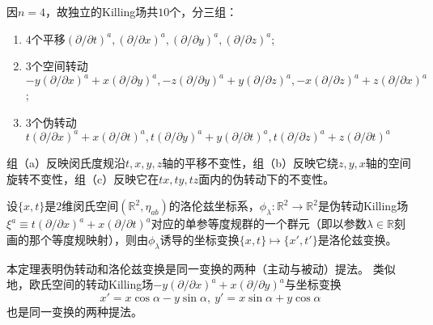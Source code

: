 \begin{example}
\begin{enumerate}[（1）]
因$n = 4$，故独立的Killing场共$10$个，分三组：
\begin{enumerate}[（a）]
\item $4$个平移$(\partial / \partial t)^a, (\partial / \partial x)^a, (\partial / \partial y)^a, (\partial / \partial z)^a$;
\item $3$个空间转动$-y(\partial / \partial x)^a + x(\partial / \partial y)^a, -z(\partial / \partial y)^a + y(\partial / \partial z)^a, -x(\partial / \partial z)^a + z(\partial / \partial x)^a$;
\item $3$个伪转动$t(\partial / \partial x)^a + x(\partial / \partial t)^a, t(\partial / \partial y)^a + y(\partial / \partial t)^a, t(\partial / \partial z)^a + z(\partial / \partial t)^a$
\end{enumerate}
组（a）反映闵氏度规沿$t, x, y, z$轴的平移不变性，组（b）反映它绕$z, y, x$轴的空间旋转不变性，组（c）反映它在$tx, ty, tz$面内的伪转动下的不变性。
\end{enumerate}
\end{example}

\begin{theorem}
设$\{x, t\}$是$2$维闵氏空间$(\mathbb{R}^2, \eta_{ab})$的洛伦兹坐标系，$\phi_\lambda \colon \mathbb{R}^2 \to \mathbb{R}^2$是伪转动Killing场$\xi^a \equiv t(\partial / \partial x)^a + x(\partial / \partial t)^a$对应的单参等度规群的一个群元（即以参数$\lambda \in \mathbb{R}$刻画的那个等度规映射），则由$\phi_\lambda$诱导的坐标变换$\{x, t\} \mapsto \{x', t'\}$是洛伦兹变换。
\end{theorem}

\begin{note}
本定理表明伪转动和洛伦兹变换是同一变换的两种（主动与被动）提法。
类似地，欧氏空间的转动Killing场$-y(\partial / \partial x)^a + x(\partial / \partial y)^a$与坐标变换
$$x' = x\cos\alpha - y\sin\alpha, ~ y' = x\sin\alpha + y\cos\alpha$$
也是同一变换的两种提法。
\end{note}

